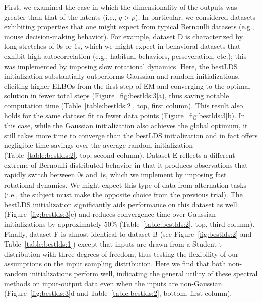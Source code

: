 First, we examined the case in which the dimensionality of the outputs was greater than that of the latents (i.e., $q > p$). In particular, we considered datasets exhibiting properties that one might expect from typical Bernoulli datasets (e.g., mouse decision-making behavior). For example, dataset D is characterized by long stretches of $0$s or $1$s, which we might expect in behavioral datasets that exhibit high autocorrelation (e.g., habitual behaviors, perseveration, etc.); this was implemented by imposing slow rotational dynamics. Here, the bestLDS initialization substantially outperforms Gaussian and random initializations, eliciting higher ELBOs from the first step of EM and converging to the optimal solution in fewer total steps (Figure~\ref{fig:bestlds:3}a), thus saving notable computation time (Table~\ref{table:bestlds:2}, top, first column). This result also holds for the same dataset fit to fewer data points (Figure~\ref{fig:bestlds:3}b). In this case, while the Gaussian initialization also achieves the global optimum, it still takes more time to converge than the bestLDS initialization and in fact offers negligible time-savings over the average random initialization (Table~\ref{table:bestlds:2}, top, second column). Dataset E reflects a different extreme of Bernoulli-distributed behavior in that it produces observations that rapidly switch between $0$s and $1$s, which we implement by imposing fast rotational dynamics. We might expect this type of data from alternation tasks (i.e., the subject must make the opposite choice from the previous trial). The bestLDS initialization significantly aids performance on this dataset as well (Figure~\ref{fig:bestlds:3}c) and reduces convergence time over Gaussian initializations by approximately 50$\%$ (Table~\ref{table:bestlds:2}, top, third column). Finally, dataset F is almost identical to dataset B (see Figure~\ref{fig:bestlds:2} and Table~\ref{table:bestlds:1}) except that inputs are drawn from a Student-t distribution with three degrees of freedom, thus testing the flexibility of our assumptions on the input sampling distribution. Here we find that both non-random initializations perform well, indicating the general utility of these spectral methods on input-output data even when the inputs are non-Gaussian (Figure~\ref{fig:bestlds:3}d and Table~\ref{table:bestlds:2}, bottom, first column).

